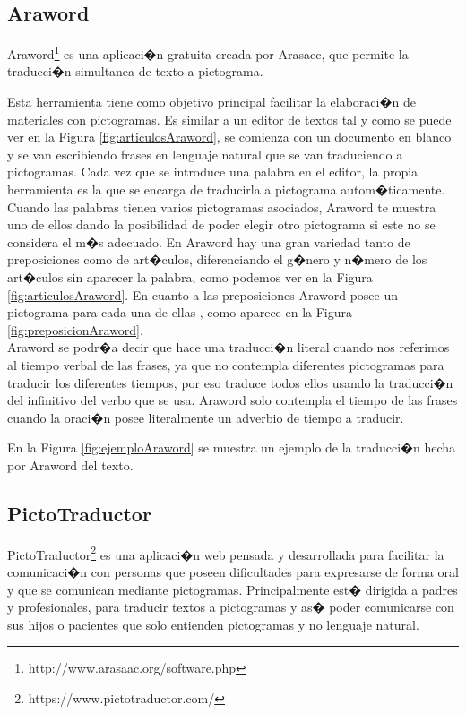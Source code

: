 \subsection{Araword}
Araword\footnote{http://www.arasaac.org/software.php} es una aplicaci�n gratuita creada por Arasacc, que permite la traducci�n simultanea de texto a pictograma.

Esta herramienta tiene como objetivo principal facilitar la elaboraci�n de materiales con pictogramas. Es similar a un editor de textos tal y como se puede ver en la Figura \ref{fig:articulosAraword}, se comienza con un documento en blanco y se van escribiendo frases en lenguaje natural que se van traduciendo a pictogramas. 
Cada vez que se introduce una palabra en el editor, la propia herramienta es la que se encarga de traducirla a pictograma autom�ticamente. Cuando las palabras tienen varios pictogramas asociados, Araword te muestra uno de ellos dando la posibilidad de poder elegir otro pictograma si este no se considera el m�s adecuado.
En Araword hay una gran variedad tanto de preposiciones como de art�culos, diferenciando el g�nero y n�mero de los art�culos sin aparecer la palabra, como podemos ver en la Figura \ref{fig:articulosAraword}.
En cuanto a las preposiciones Araword posee un pictograma para cada una de ellas , como aparece en la Figura \ref{fig:preposicionAraword}.
\\
Araword se podr�a decir que hace una traducci�n literal cuando nos referimos al tiempo verbal de las frases, ya que no contempla diferentes pictogramas para traducir los diferentes tiempos, por eso traduce todos ellos usando la traducci�n del infinitivo del verbo que se usa. Araword solo contempla el tiempo de las frases cuando la oraci�n posee literalmente un adverbio de tiempo a traducir.

En la Figura \ref{fig:ejemploAraword} se muestra un ejemplo de la traducci�n hecha por Araword del texto.

\subsection{PictoTraductor}
PictoTraductor\footnote{https://www.pictotraductor.com/} es una aplicaci�n web pensada y desarrollada para facilitar la comunicaci�n con personas que poseen dificultades para expresarse de forma oral y que se comunican mediante pictogramas. Principalmente est� dirigida a padres y profesionales, para traducir textos a pictogramas y as� poder comunicarse con sus hijos o pacientes que solo entienden pictogramas y no lenguaje natural.

